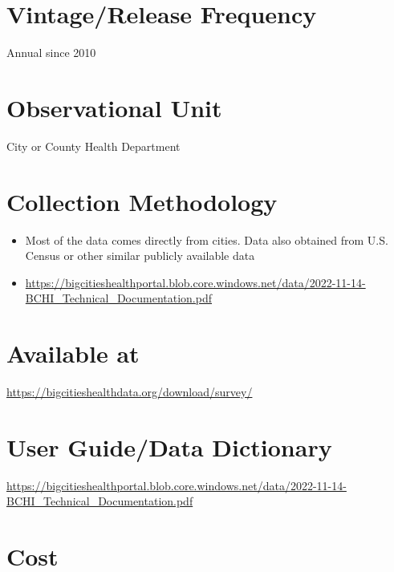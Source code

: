 \documentclass[
]{book}
\providecommand{\tightlist}{%
  \setlength{\itemsep}{0pt}\setlength{\parskip}{0pt}}
\begin{document}
\hypertarget{vintagerelease-frequency-12}{%
\section{Vintage/Release Frequency}\label{vintagerelease-frequency-12}}

Annual since 2010

\hypertarget{observational-unit-12}{%
\section{Observational Unit}\label{observational-unit-12}}

City or County Health Department

\hypertarget{collection-methodology-12}{%
\section{Collection Methodology}\label{collection-methodology-12}}

\begin{itemize}
\tightlist
\item
  Most of the data comes directly from cities. Data also obtained from U.S. Census or other similar publicly available data
\item
  \url{https://bigcitieshealthportal.blob.core.windows.net/data/2022-11-14-BCHI_Technical_Documentation.pdf}
\end{itemize}

\hypertarget{available-at-12}{%
\section{Available at}\label{available-at-12}}

\url{https://bigcitieshealthdata.org/download/survey/}

\hypertarget{user-guidedata-dictionary-12}{%
\section{User Guide/Data Dictionary}\label{user-guidedata-dictionary-12}}

\url{https://bigcitieshealthportal.blob.core.windows.net/data/2022-11-14-BCHI_Technical_Documentation.pdf}

\hypertarget{cost-12}{%
\section{Cost}\label{cost-12}}
\end{document}
